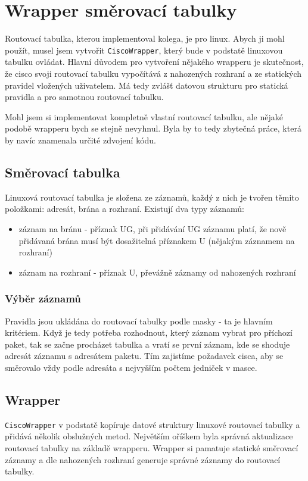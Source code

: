 \section{Wrapper směrovací tabulky}
Routovací tabulka, kterou implementoval kolega, je  pro linux. Abych ji mohl použít, musel jsem vytvořit \verb|CiscoWrapper|, který bude v podstatě linuxovou tabulku ovládat. Hlavní důvodem pro vytvoření nějakého wrapperu je skutečnost, že cisco svoji routovací tabulku vypočítává z nahozených rozhraní a ze statických pravidel vložených uživatelem. Má tedy zvlášť datovou strukturu pro statická pravidla a pro samotnou routovací tabulku.

Mohl jsem si implementovat kompletně vlastní routovací tabulku, ale nějaké podobě wrapperu bych se stejně nevyhnul. Byla by to tedy zbytečná práce, která by navíc znamenala určité zdvojení kódu.


\subsection{Směrovací tabulka}
Linuxová routovací tabulka je složena ze záznamů, každý z nich je tvořen těmito položkami: adresát, brána a rozhraní. Existují dva typy záznamů:
\begin{itemize}
 \item záznam na bránu - příznak UG, při přidávání UG záznamu platí, že nově přidávaná brána musí být dosažitelná příznakem U (nějakým záznamem na rozhraní)
 \item záznam na rozhraní - příznak U, převážně záznamy od nahozených rozhraní
\end{itemize}


\subsubsection{Výběr záznamů}
Pravidla jsou ukládána do routovací tabulky podle masky - ta je hlavním kritériem. Když je tedy potřeba rozhodnout, který záznam vybrat pro příchozí paket, tak se začne procházet tabulka a vratí se první záznam, kde se shoduje adresát záznamu s adresátem paketu. Tím zajistíme požadavek cisca, aby se směrovalo vždy podle adresáta s nejvyšším počtem jedniček v masce.

\subsection{Wrapper}
\verb|CiscoWrapper| v podstatě kopíruje datové struktury linuxové routovací tabulky a přidává několik obslužných metod. Největším oříškem byla správná aktualizace routovací tabulky na základě wrapperu. Wrapper si pamatuje statické směrovací záznamy a dle nahozených rozhraní generuje správné záznamy do routovací tabulky. 

